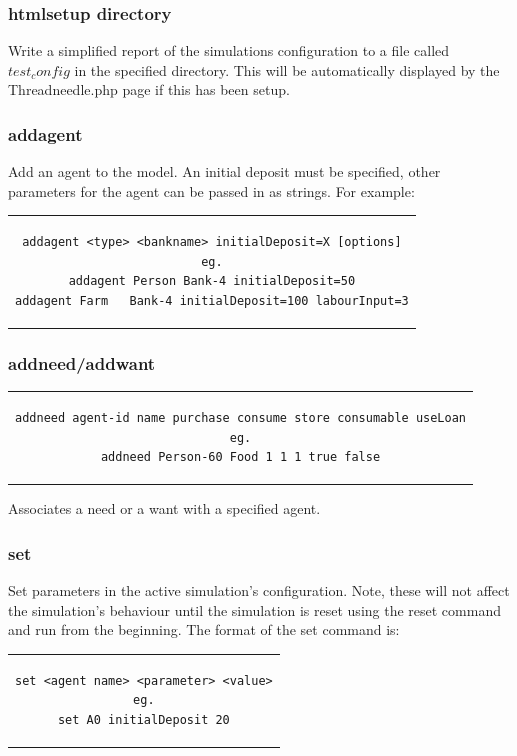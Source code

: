\documentclass[10pt,oneside,openright, a4paper]{memoir}
\begin{document}
\subsubsection{htmlsetup directory}
Write a simplified report of the simulations configuration 
to a file called $test_config$ in the specified directory. This
will be automatically displayed by the Threadneedle.php page
if this has been setup.
\subsubsection{addagent}
Add an agent to the model. An initial deposit must be specified,
other parameters for the agent can be passed in as strings. For example:
\begin{center}
\begin{tabular}{c}
\begin{lstlisting}
addagent <type> <bankname> initialDeposit=X [options]
eg.
addagent Person Bank-4 initialDeposit=50
addagent Farm   Bank-4 initialDeposit=100 labourInput=3
\end{lstlisting}
\end{tabular}
\end{center}
\subsubsection{addneed/addwant}
\begin{center}
\begin{tabular}{c}
\begin{lstlisting}
addneed agent-id name purchase consume store consumable useLoan
eg.
addneed Person-60 Food 1 1 1 true false
\end{lstlisting}
\end{tabular}
\end{center}
Associates a need or a want with a specified agent.
\subsubsection{set}
Set parameters in the active simulation's configuration. Note, these
will not affect the simulation's behaviour until the simulation
is reset using the reset command and run from the beginning. The
format of the set command is:
\begin{center}
\begin{tabular}{c}
\begin{lstlisting}
set <agent name> <parameter> <value>
eg.
set A0 initialDeposit 20
\end{lstlisting}
\end{tabular}
\end{center}
%
\end{document}
